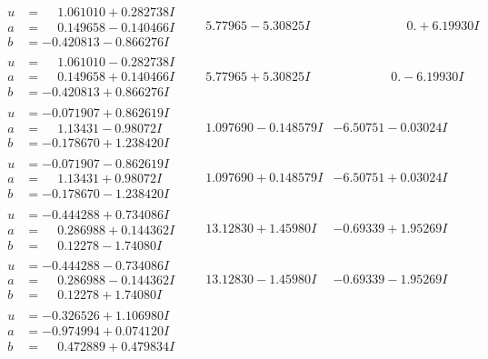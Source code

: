 \documentclass[1p]{elsarticle_modified}
\theoremstyle{definition}
\begin{document}
$$\begin{array}{c|c|c}
\begin{aligned}
u &= \phantom{-}1.061010 + 0.282738 I \\
a &= \phantom{-}0.149658 - 0.140466 I \\
b &= -0.420813 - 0.866276 I\end{aligned}
 & \phantom{-}5.77965 - 5.30825 I & \phantom{-0.000000 -}0. + 6.19930 I \\ \hline\begin{aligned}
u &= \phantom{-}1.061010 - 0.282738 I \\
a &= \phantom{-}0.149658 + 0.140466 I \\
b &= -0.420813 + 0.866276 I\end{aligned}
 & \phantom{-}5.77965 + 5.30825 I & \phantom{-0.000000 } 0. - 6.19930 I \\ \hline\begin{aligned}
u &= -0.071907 + 0.862619 I \\
a &= \phantom{-}1.13431 - 0.98072 I \\
b &= -0.178670 + 1.238420 I\end{aligned}
 & \phantom{-}1.097690 - 0.148579 I & -6.50751 - 0.03024 I \\ \hline\begin{aligned}
u &= -0.071907 - 0.862619 I \\
a &= \phantom{-}1.13431 + 0.98072 I \\
b &= -0.178670 - 1.238420 I\end{aligned}
 & \phantom{-}1.097690 + 0.148579 I & -6.50751 + 0.03024 I \\ \hline\begin{aligned}
u &= -0.444288 + 0.734086 I \\
a &= \phantom{-}0.286988 + 0.144362 I \\
b &= \phantom{-}0.12278 - 1.74080 I\end{aligned}
 & \phantom{-}13.12830 + 1.45980 I & -0.69339 + 1.95269 I \\ \hline\begin{aligned}
u &= -0.444288 - 0.734086 I \\
a &= \phantom{-}0.286988 - 0.144362 I \\
b &= \phantom{-}0.12278 + 1.74080 I\end{aligned}
 & \phantom{-}13.12830 - 1.45980 I & -0.69339 - 1.95269 I \\ \hline\begin{aligned}
u &= -0.326526 + 1.106980 I \\
a &= -0.974994 + 0.074120 I \\
b &= \phantom{-}0.472889 + 0.479834 I\end{aligned}

\end{array}$$
\end{document}
